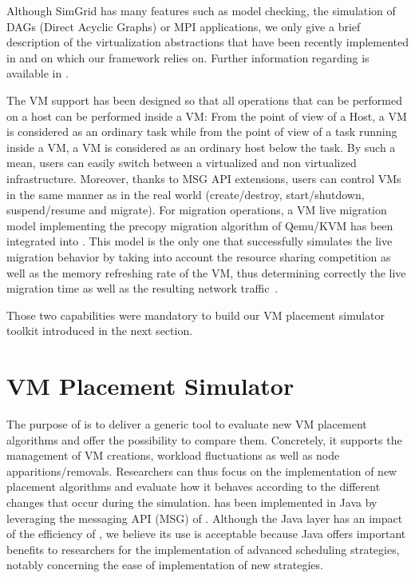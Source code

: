 Although SimGrid has many features such as model checking, the
simulation of DAGs (Direct Acyclic Graphs) or MPI applications, we
only give a brief description of the  virtualization  abstractions
that have been recently implemented in \sg and on which our framework relies
on.  Further information regarding \sg is available in \cite{casanova:hal-01017319}.

The VM support has been designed so that all operations that can be performed
on a host can be performed inside a VM: From the point of view of a \sg
Host, a \sg VM is considered as an ordinary task while from the point
of view of a task running inside a \sg VM, a VM is considered as an
ordinary host below the task.  By such a mean, \sg users can easily
switch between a virtualized and non virtualized infrastructure.
Moreover, thanks to  MSG API extensions, users can control VMs in the
same manner as in the real world (\eg create/destroy, start/shutdown,
suspend/resume and migrate).
For migration operations, a VM live migration model implementing the
precopy migration algorithm of Qemu/KVM has been integrated into \sg.
This model is the only one that successfully simulates the live
migration behavior by taking into account the resource sharing
competition as well as the memory refreshing rate of the VM, thus
determining correctly the live migration time as well as the resulting
network traffic~\cite{Hirofuchi:2013:ALM:2568486.2568524}.


Those two capabilities were mandatory to build our VM placement
simulator toolkit introduced in the next section.

\section{VM Placement Simulator}
\label{sec:injector}

The purpose of \vmps is to deliver a generic tool to evaluate new VM
placement algorithms and offer the possibility to compare
them. Concretely, it supports the management of VM creations, workload
fluctuations as well as node apparitions/removals.  Researchers can
thus focus on the implementation of new placement algorithms and
evaluate how it behaves according to the different changes that occur
during the simulation.
%
\vmps has been implemented in Java by leveraging the messaging API
(MSG) of \sg.  Although the Java layer has an impact of the efficiency
of \sg, we believe its use is acceptable because Java offers important
benefits to researchers for the implementation of advanced scheduling
strategies, notably concerning the ease of implementation of new
strategies. 

